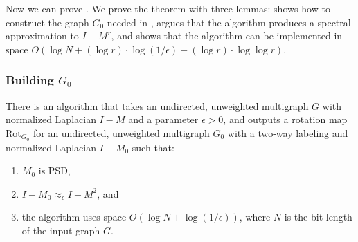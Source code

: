 \documentclass{toc}
\newcommand{\SC}{O(\log N + (\log r)\cdot\log(1/\epsilon)+(\log r)\cdot \log\log r)}
\numberwithin{myalgctr}{section}
\theoremstyle{named}
\begin{document}
Now we can prove . We prove the theorem with three lemmas:  shows how to construct the graph $G_0$ needed in ,  argues that the algorithm produces a spectral approximation to $I-M^r$, and  shows that the algorithm can be implemented in space $\SC$. 
\subsubsection{Building \texorpdfstring{$G_0$}{G0}}
\begin{lemma}
\label{lem:buildpsdG}
There is an algorithm that takes an undirected, unweighted multigraph $G$ with normalized Laplacian $I-M$ and a parameter $\epsilon>0$, and outputs a rotation map Rot$_{G_0}$ for an undirected, unweighted multigraph $G_0$ with a two-way labeling and normalized Laplacian $I-M_0$ such that:
\begin{enumerate}
\item $M_0$ is PSD,
\item $I-M_0\approx_{\epsilon}I-M^2$, and
\item the algorithm uses space $O(\log N +\log(1/\epsilon))$, where $N$ is the bit length of the input graph $G$.
\end{enumerate}
\end{lemma}
\end{document}
